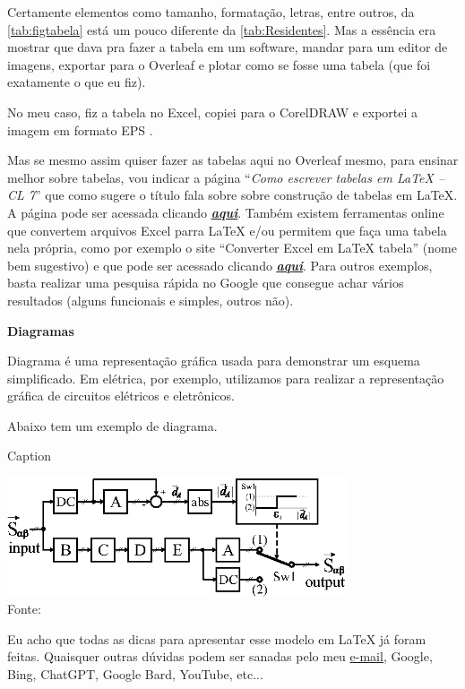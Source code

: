 Certamente elementos como tamanho, formatação, letras, entre outros, da \autoref{tab:figtabela} está um pouco diferente da \autoref{tab:Residentes}. Mas a essência era mostrar que dava pra fazer a tabela em um software, mandar para um editor de imagens, exportar para o Overleaf e plotar como se fosse uma tabela (que foi exatamente o que eu fiz).

No meu caso, fiz a tabela no Excel, copiei para o CorelDRAW e exportei a imagem em formato EPS .

Mas se mesmo assim quiser fazer as tabelas aqui no Overleaf mesmo, para ensinar melhor sobre tabelas, vou indicar a página ``\textit{Como escrever tabelas em LaTeX – CL 7}'' que como sugere o título fala sobre sobre construção de tabelas em LaTeX. A página pode ser acessada clicando \href{https://vidaestudantil.com/podcasts/como-escrever-tabelas-em-latex-cl-7/}{\underline{\textit{\textbf{aqui}}}}. Também existem ferramentas online que convertem arquivos Excel parra LaTeX e/ou permitem que faça uma tabela nela própria, como por exemplo o site ``Converter Excel em LaTeX tabela'' (nome bem sugestivo) e que pode ser acessado clicando \href{https://tableconvert.com/pt/excel-to-latex}{\underline{\textit{\textbf{aqui}}}}. Para outros exemplos, basta realizar uma pesquisa rápida no Google que consegue achar vários resultados (alguns funcionais e simples, outros não).\vspace{0.2cm}

\noindent \textbf{Diagramas}

Diagrama é uma representação gráfica usada para demonstrar um esquema simplificado. Em elétrica, por exemplo, utilizamos para realizar a representação gráfica de circuitos elétricos e eletrônicos.

Abaixo tem um exemplo de diagrama.

\begin{diagrama}
    \caption{Caption}
    \includegraphics[width=100mm]{figuras/diagramaBlocos.eps}\\
    \centering Fonte: 
    \label{fig:VSGDSC}
\end{diagrama}

Eu acho que todas as dicas para apresentar esse modelo em LaTeX já foram feitas. Quaisquer outras dúvidas podem ser sanadas pelo meu \href{mailto:christian.araujo96@outlook.com}{e-mail}, Google, Bing, ChatGPT, Google Bard, YouTube, etc...